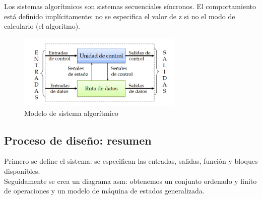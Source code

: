 Los sistemas algorítmicos son sistemas secuenciales síncronos. El comportamiento está definido implícitamente: no se especifica el valor de z si no el modo de calcularlo (el algoritmo).
\begin{figure}[H]
	\centering
	\includegraphics[width=0.7\textwidth]{images/Tema_4/Modelo_algoritmico.PNG}
	\caption{Modelo de sistema algorítmico}
\end{figure}

\subsection{Proceso de diseño: resumen}
Primero se define el sistema: se especifican las entradas, salidas, función y bloques disponibles.\\
Seguidamente se crea un diagrama \gls{asm}: obtenemos un conjunto ordenado y finito de operaciones y un modelo de máquina de estados generalizada.\\

